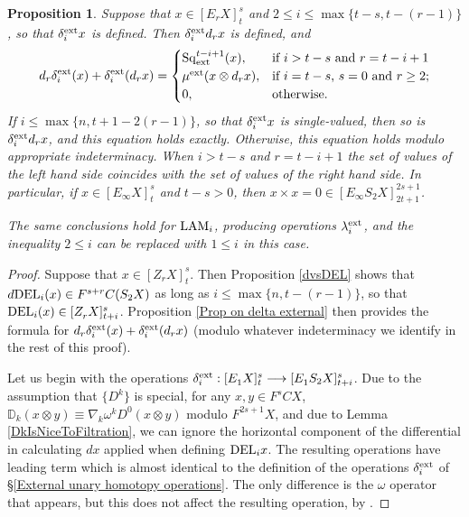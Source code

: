 \documentclass[11pt]{amsart} \renewcommand{\baselinestretch}{1.2}
\theoremstyle{plain}
\newtheorem{prop}[thm]{Proposition}
\theoremstyle{definition}
\renewcommand{\to}{\longrightarrow}
\newcommand{\twist}{\omega}
\newcommand{\Sq}{\mathrm{Sq}}
\newcommand{\E}[5]{[E^{#1}_{#2}#3]^{#4}_{#5}}
\newcommand{\Edownup}[5]{[E_{#1}^{#2}#3]^{#4}_{#5}}
\newcommand{\EZdownup}[5]{[Z^{#2}_{#1}#3]^{#4}_{#5}}
\begin{document}
\begin{second quadrant homotopy sseq operations}
\begin{prop}
Suppose that $x\in \E{}{r}{X}{s}{t}$ and $2\leq i\leq \max\{t-s,t-(r-1)\}$, so that $\delta^\textup{ext}_ix $ is defined. Then $\delta^\textup{ext}_i d_r x$ is defined, and 
\[d_r\delta^\textup{ext}_i(x)+ \delta^\textup{ext}_i(d_rx)=\begin{cases}
\Sq_\textup{ext}^{t-i+1}(x),&\textup{if $i>t-s$ and $r =t-i+1$}\\
\mu^\textup{ext}(x\otimes d_rx),&\textup{if $i=t-s$,  $s=0$ and $r\geq2$};\\
0,&\textup{otherwise.}
\end{cases}\]
If $i\leq \max\{n,t+1-2(r-1)\}$, so that $\delta^\textup{ext}_i x$ is single-valued, then so is $\delta^\textup{ext}_i d_r x$, and this equation holds exactly. Otherwise, this equation holds modulo appropriate indeterminacy. When $i>t-s$ and $r =t-i+1$ the set of values of the left hand side coincides with the set of values of the right hand side.  In particular, if $x\in \E{}{\infty}{X}{s}{t}$ and $t-s>0$, then $x\times x=0\in\E{}{\infty}{S_2X}{2s+1}{2t+1}$.

The same conclusions hold for $\textup{LAM}_i$, producing operations $\lambda_i^\textup{ext}$, and the inequality $2\leq i$ can be replaced with $1\leq i$ in this case.
\end{prop}
\begin{proof}
Suppose that $x\in \EZdownup{r}{}{X}{s}{t}$. Then Proposition \ref{dvsDEL} shows that $d\textup{DEL}_i(x)\in F^{s+r}C(S_2X)$ as long as $i\leq \max\{n,t-(r-1)\}$, so that $\textup{DEL}_i(x)\in \EZdownup{r}{}{X}{s}{t+i}$. 
Proposition \ref{Prop on delta external} then provides the formula for 
$d_r\delta^\textup{ext}_i(x)+ \delta^\textup{ext}_i(d_rx)$ (modulo whatever indeterminacy we identify in the rest of this proof).

Let us begin with the operations $\delta^\textup{ext}_i:\Edownup{1}{}{X}{s}{t}\to \Edownup{1}{}{S_2X}{s}{t+i}$. Due to the assumption that $\{D^k\}$ is special, for any $x,y\in F^{s}CX$, $\mathbb{D}_k(x\otimes  y)\equiv \nabla_k\twist^k D^0(x\otimes y) $ modulo $F^{2s+1}X$, and due to Lemma \ref{DkIsNiceToFiltration}, we can ignore the horizontal component of the differential in calculating $dx$ applied when defining $\textup{DEL}_ix$. The resulting operations have leading term which is almost identical to the definition of the operations $\delta_i^\textup{ext}$ of \S\ref{External unary homotopy operations}. The only difference is the $\twist$ operator that appears, but this does not affect the resulting operation, by \cite[Lemma 4.1]{DwyerHtpyOpsSimpComAlg.pdf}.


\end{proof}
\end{second quadrant homotopy sseq operations}
\end{document}
